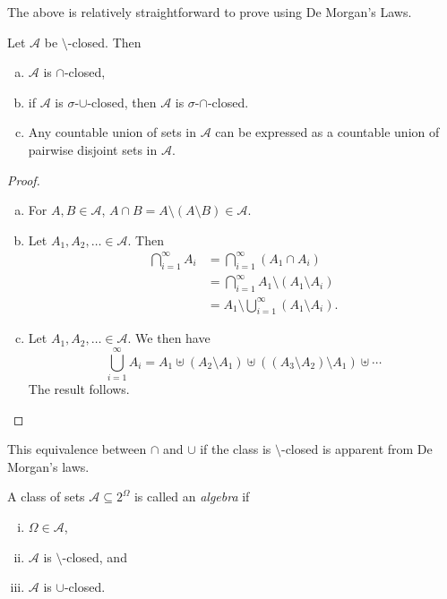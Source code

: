 The above is relatively straightforward to prove using De Morgan's Laws.

\begin{theorem}
\label{if setminus closed}
    Let $\mathcal{A}$ be $\setminus$-closed. Then
    \begin{enumerate}[(a)]
        \item $\mathcal{A}$ is $\cap$-closed,
        \item if $\mathcal{A}$ is $\sigma$-$\cup$-closed, then $\mathcal{A}$ is $\sigma$-$\cap$-closed.
        \item Any countable union of sets in $\mathcal{A}$ can be expressed as a countable union of pairwise disjoint sets in $\mathcal{A}$.
    \end{enumerate}
\end{theorem}
\begin{proof}
~
\begin{enumerate}[(a)]
    \item For $A,B\in\mathcal{A}$, $A\cap B=A\setminus(A\setminus B)\in\mathcal{A}$.
    \item Let $A_1,A_2,\ldots\in\mathcal{A}$. Then
    \begin{align*}
        \bigcap_{i=1}^\infty A_i &= \bigcap_{i=1}^\infty (A_1\cap A_i) \\
        &= \bigcap_{i=1}^\infty A_1\setminus (A_1\setminus A_i) \\
        &= A_1\setminus\bigcup_{i=1}^\infty (A_1\setminus A_i).
    \end{align*}
    \item Let $A_1,A_2,\ldots\in\mathcal{A}$. We then have
    $$\bigcup_{i=1}^\infty A_i = A_1 \uplus (A_2\setminus A_1)\uplus ((A_3\setminus A_2)\setminus A_1)\uplus\cdots$$
    The result follows.
    \end{enumerate}
\end{proof}

This equivalence between $\cap$ and $\cup$ if the class is $\setminus$-closed is apparent from De Morgan's laws.

\begin{definition}[Algebra]
\label{defAlgebra}
    A class of sets $\mathcal{A}\subseteq2^\Omega$ is called an \textit{algebra} if
    \begin{enumerate}[(i)]
        \item $\Omega\in\mathcal{A}$,
        \item $\mathcal{A}$ is $\setminus$-closed, and
        \item $\mathcal{A}$ is $\cup$-closed.
    \end{enumerate}
\end{definition}


